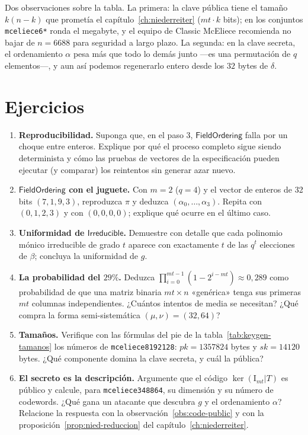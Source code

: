 \documentclass[11pt,a4paper,oneside]{report}
\begin{document}
Dos observaciones sobre la tabla. La primera: la clave pública tiene el
tamaño $k(n-k)$ que prometía el capítulo~\ref{ch:niederreiter}
($mt\cdot k$ bits); en los conjuntos \texttt{mceliece6*} ronda el
megabyte, y el equipo de Classic McEliece recomienda no bajar de
$n=6688$ para seguridad a largo plazo. La segunda: en la clave secreta,
el ordenamiento $\alpha$ pesa
más que todo lo demás junto ---es una permutación de $q$ elementos---,
y aun así podemos regenerarlo entero desde los $32$ bytes de $\delta$.

\section{Ejercicios}

\begin{enumerate}[leftmargin=1.6em,itemsep=4pt]
  \item \textbf{Reproducibilidad.} Suponga que, en el paso 3,
        $\textsf{FieldOrdering}$ falla por un choque entre enteros.
        Explique por qué el proceso completo sigue siendo determinista
        y cómo las pruebas de vectores de la especificación pueden
        ejecutar (y comparar) los reintentos sin generar azar nuevo.
  \item \textbf{$\textsf{FieldOrdering}$ con el juguete.} Con $m=2$
        ($q=4$) y el vector de enteros de 32 bits $(7,1,9,3)$,
        reproduzca $\pi$ y deduzca $(\alpha_0,\dots,\alpha_3)$. Repita
        con $(0,1,2,3)$ y con $(0,0,0,0)$; explique qué ocurre en el
        último caso.
  \item \textbf{Uniformidad de $\textsf{Irreducible}$.} Demuestre con
        detalle que cada polinomio mónico irreducible de grado $t$
        aparece con exactamente $t$ de las $q^t$ elecciones de
        $\beta$; concluya la uniformidad de $g$.
  \item \textbf{La probabilidad del $29\%$.} Deduzca
        $\prod_{i=0}^{mt-1}(1-2^{i-mt})\approx0{,}289$ como
        probabilidad de que una matriz binaria $mt\times n$
        «genérica» tenga sus primeras $mt$ columnas independientes.
        ¿Cuántos intentos de media se necesitan? ¿Qué compra la forma
        semi-sistemática $(\mu,\nu)=(32,64)$?
  \item \textbf{Tamaños.} Verifique con las fórmulas del pie de la
        tabla~\ref{tab:keygen-tamanos} los números de
        \texttt{mceliece8192128}: $pk=1357824$ bytes y $sk=14120$
        bytes. ¿Qué componente domina la clave secreta, y cuál la
        pública?
  \item \textbf{El secreto es la descripción.} Argumente que el código
        $\ker(\mathrm{I}_{mt}|T)$ es público y calcule, para
        \texttt{mceliece348864}, su dimensión y su número de
        codewords. ¿Qué gana un atacante que descubra $g$ y el
        ordenamiento $\alpha$? Relacione la respuesta con la
        observación~\ref{obs:code-public} y con la
        proposición~\ref{prop:nied-reduccion} del
        capítulo~\ref{ch:niederreiter}.
\end{enumerate}
\end{document}
